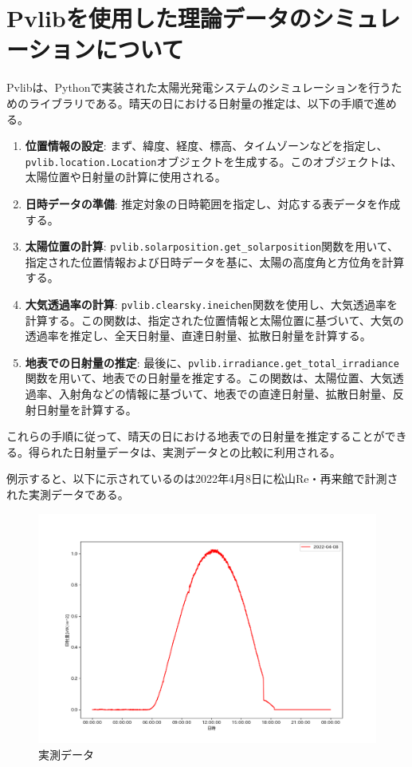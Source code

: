 \documentclass[a4j,12pt,]{jarticle}
\begin{document}
\section{Pvlibを使用した理論データのシミュレーションについて}
Pvlibは、Pythonで実装された太陽光発電システムのシミュレーションを行うためのライブラリである。晴天の日における日射量の推定は、以下の手順で進める。

\begin{enumerate}
\item \textbf{位置情報の設定}: まず、緯度、経度、標高、タイムゾーンなどを指定し、\texttt{pvlib.location.Location}オブジェクトを生成する。このオブジェクトは、太陽位置や日射量の計算に使用される。
\item \textbf{日時データの準備}: 推定対象の日時範囲を指定し、対応する表データを作成する。
\item \textbf{太陽位置の計算}: \texttt{pvlib.solarposition.get\_solarposition}関数を用いて、指定された位置情報および日時データを基に、太陽の高度角と方位角を計算する。
\item \textbf{大気透過率の計算}: \texttt{pvlib.clearsky.ineichen}関数を使用し、大気透過率を計算する。この関数は、指定された位置情報と太陽位置に基づいて、大気の透過率を推定し、全天日射量、直達日射量、拡散日射量を計算する。
\item \textbf{地表での日射量の推定}: 最後に、\texttt{pvlib.irradiance.get\_total\_irradiance}関数を用いて、地表での日射量を推定する。この関数は、太陽位置、大気透過率、入射角などの情報に基づいて、地表での直達日射量、拡散日射量、反射日射量を計算する。
\end{enumerate}

これらの手順に従って、晴天の日における地表での日射量を推定することができる。得られた日射量データは、実測データとの比較に利用される。

例示すると、以下に示されているのは2022年4月8日に松山Re・再来館で計測された実測データである。

\begin{figure}[H]
  \begin{center}
    \includegraphics[width=160mm]{2.png}
    \caption{実測データ}
    \label{p2}
  \end{center}
\end{figure}
\end{document}
